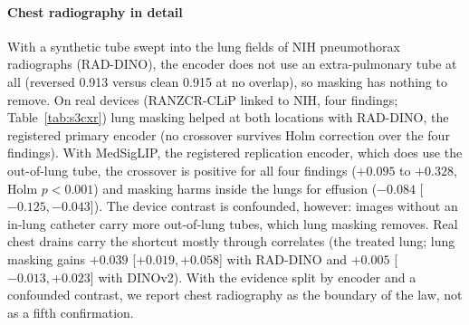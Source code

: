 
\paragraph{Chest radiography in detail} With a synthetic tube swept into the lung fields of NIH pneumothorax radiographs (RAD-DINO), the encoder does not use
an extra-pulmonary tube at all (reversed 0.913 versus clean 0.915 at no overlap), so masking has nothing to remove. On
real devices (RANZCR-CLiP linked to NIH, four findings; Table~\ref{tab:s3cxr}) lung masking helped at both locations with
RAD-DINO, the registered primary encoder (no crossover survives Holm correction over the four findings). With MedSigLIP, the registered
replication encoder, which does use the out-of-lung tube, the crossover is positive for all four findings ($+0.095$ to
$+0.328$, Holm $p<0.001$) and masking harms inside the lungs for effusion ($-0.084$ [$-0.125, -0.043$]). The device
contrast is confounded, however: images without an in-lung catheter carry more out-of-lung tubes, which lung masking
removes. Real chest drains carry the shortcut mostly through correlates (the treated lung; lung masking gains $+0.039$
[$+0.019, +0.058$] with RAD-DINO and $+0.005$ [$-0.013, +0.023$] with DINOv2). With the evidence split by encoder and a
confounded contrast, we report chest radiography as the boundary of the law, not as a fifth confirmation.
